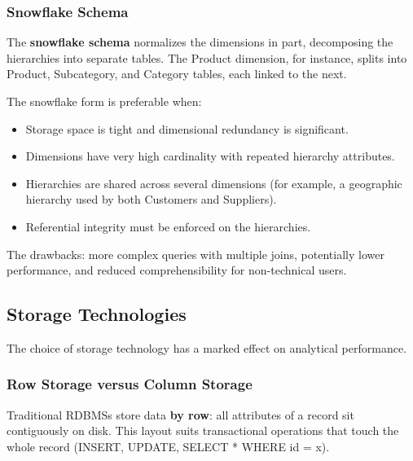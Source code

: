 \subsubsection{Snowflake Schema}
\label{subsec:snowflake-schema}

\begin{notebox}
The \textbf{snowflake schema} normalizes the dimensions in part, decomposing the hierarchies into separate tables. The Product dimension, for instance, splits into Product, Subcategory, and Category tables, each linked to the next.

The snowflake form is preferable when:
\begin{itemize}
    \item Storage space is tight and dimensional redundancy is significant.
    \item Dimensions have very high cardinality with repeated hierarchy attributes.
    \item Hierarchies are shared across several dimensions (for example, a geographic hierarchy used by both Customers and Suppliers).
    \item Referential integrity must be enforced on the hierarchies.
\end{itemize}

The drawbacks: more complex queries with multiple joins, potentially lower performance, and reduced comprehensibility for non-technical users.
\end{notebox}

\subsection{Storage Technologies}
\label{sec:storage-technologies}

The choice of storage technology has a marked effect on analytical performance.

\subsubsection{Row Storage versus Column Storage}
\label{subsec:row-vs-column-storage}

Traditional RDBMSs store data \textbf{by row}: all attributes of a record sit contiguously on disk. This layout suits transactional operations that touch the whole record (INSERT, UPDATE, SELECT * WHERE id = x).

